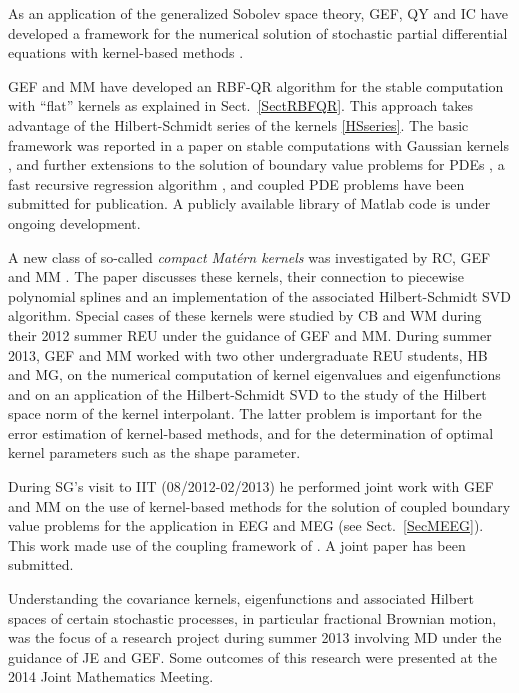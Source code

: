 \documentclass[11pt]{NSFamsart}
\newcommand{\Matlab}{{\sc Matlab}\xspace}
\begin{document}
As an application of the generalized Sobolev space theory, GEF, QY and IC have developed a framework for the numerical solution of stochastic partial differential equations with kernel-based methods \citep{CFY12,FasshauerYe13b,FasshauerYe14}.

GEF and MM have developed an RBF-QR algorithm for the stable computation with ``flat'' kernels as explained in Sect.~\ref{SectRBFQR}. This approach takes advantage of the Hilbert-Schmidt series of the kernels \eqref{HSseries}. The basic framework was reported in a paper on stable computations with Gaussian kernels \citep{FMcC12}, and further extensions to the solution of boundary value problems for PDEs \citep{McCourt13}, a fast recursive regression algorithm \citep{McCourt13b}, and coupled PDE problems \citep{McCF13} have been submitted for publication. A publicly available library of \Matlab code \citep{McCFBG13} is under ongoing development.

A new class of so-called \emph{compact Mat\'ern kernels} was investigated by RC, GEF and MM \citep{CavorettoEtAl14}. The paper discusses these kernels, their connection to piecewise polynomial splines and an implementation of the associated Hilbert-Schmidt SVD algorithm. Special cases of these kernels were studied by CB and WM during their 2012 summer REU under the guidance of GEF and MM. During summer 2013, GEF and MM worked with two other undergraduate REU students, HB and MG, on the numerical computation of kernel eigenvalues and eigenfunctions and on an application of the Hilbert-Schmidt SVD to the study of the Hilbert space norm of the kernel interpolant. The latter problem is important for the error estimation of kernel-based methods, and for the determination of optimal kernel parameters such as the shape parameter.

During SG's visit to IIT (08/2012-02/2013) he performed joint work with GEF and MM on the use of kernel-based methods for the solution of coupled boundary value problems for the application in EEG and MEG (see Sect.~\ref{SecMEEG}). This work made use of the coupling framework of \cite{McCF13}. A joint paper \citep{AFFGM13} has been submitted.

Understanding the covariance kernels, eigenfunctions and associated Hilbert spaces of certain stochastic processes, in particular fractional Brownian motion, was the focus of a research project during summer 2013 involving MD under the guidance of JE and GEF. Some outcomes of this research were presented at the 2014 Joint Mathematics Meeting.
\end{document}
